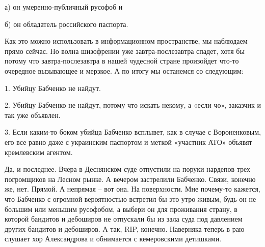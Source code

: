 а) он умеренно-публичный русофоб и 

б) он обладатель российского паспорта.

Как это можно использовать в информационном пространстве, мы наблюдаем прямо
сейчас. Но волна шизофрении уже завтра-послезавтра спадет, хотя бы потому что
завтра-послезавтра в нашей чудесной стране произойдет что-то очередное
вызывающее и мерзкое. А по итогу мы останемся со следующим:

1. Убийцу Бабченко не найдут.

2. Убийцу Бабченко не найдут, потому что искать некому, а «если чо», заказчик и
так уже объявлен.

3. Если каким-то боком убийца Бабченко всплывет, как в случае с Вороненковым,
его все равно даже с украинским паспортом и меткой «участник АТО» объявят
кремлевским агентом.

Да, и последнее. Вчера в Деснянском суде отпустили на поруки нардепов трех
погромщиков на Лесном рынке. А вечером застрелили Бабченко. Связи, конечно же,
нет. Прямой. А непрямая – вот она. На поверхности. Мне почему-то кажется, что
Бабченко с огромной вероятностью встретил бы это утро живым, будь он не большим
или меньшим русофобом, а выбери он для проживания страну, в которой бандитов и
дебоширов не отпускали бы из зала суда под давлением других бандитов и
дебоширов. А так, RIP, конечно. Наверняка теперь в раю слушает хор Александрова
и обнимается с кемеровскими детишками.

